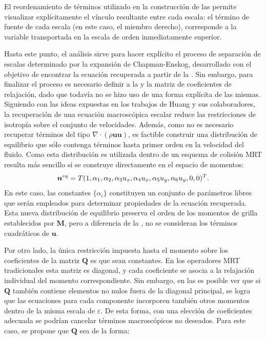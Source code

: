 El reordenamiento de t\'erminos utilizado en la construcci\'on de las  permite visualizar expl\'icitamente el v\'inculo resultante entre cada escala: el t\'ermino de fuente de cada escala (en este caso, el miembro derecho), corresponde a la variable transportada en la escala de orden inmediatamente superior.

Hasta este punto, el an\'alisis sirve para hacer expl\'icito el proceso de separaci\'on de escalas determinado por la expansi\'on de Chapman-Enskog, desarrollado con el objetivo de encontrar la ecuaci\'on recuperada a partir de la . Sin embargo, para finalizar el proceso es necesario definir a la \edf{} y la matriz de coeficientes de relajaci\'on, dado que todav\'ia no se hizo uso de una forma expl\'icita de las mismas. Siguiendo con las ideas expuestas en los trabajos de Huang y sus colaboradores, la recuperaci\'on de una ecuaci\'on macrosc\'opica escalar reduce las restricciones de isotrop\'ia sobre el conjunto de velocidades. Adem\'as, como no es necesario recuperar t\'erminos del tipo $\nabla \cdot(\rho \bm{uu})$, es factible construir una distribuci\'on de equilibrio que s\'olo contenga t\'erminos hasta primer orden en la velocidad del fluido. Como esta distribuci\'on es utilizada dentro de un esquema de colisi\'on MRT resulta m\'as sencillo si se construye directamente en el espacio de momentos:
\begin{equation}
	\bm{n}^{eq} = T(1, \alpha_1, \alpha_2, \alpha_3 u_x, \alpha_4 u_x, \alpha_5 u_y, \alpha_6 u_y, 0, 0 )^T.
\end{equation}
En este caso, las constantes $\{ \alpha_i \}$ constituyen un conjunto de par\'ametros libres que ser\'an empleados para determinar propiedades de la ecuaci\'on recuperada. Esta nueva distribuci\'on de equilibrio preserva el orden de los momentos de grilla establecidos por $\bm{M}$, pero a diferencia de la , no se consideran los t\'erminos cuadr\'aticos de $\bm{u}$.

Por otro lado, la \'unica restricci\'on impuesta hasta el momento sobre los coeficientes de la matriz $\bm{Q}$ es que sean constantes. En los operadores MRT tradicionales esta matriz es diagonal, y cada coeficiente se asocia a la relajaci\'on individual del momento correspondiente. Sin embargo, en las  es posible ver que si $\bm{Q}$ tambi\'en contiene elementos no nulos fuera de la diagonal principal, se logra que las ecuaciones para cada componente incorporen tambi\'en otros momentos dentro de la misma escala de $\varepsilon$. De esta forma, con una elecci\'on de coeficientes adecuada se podr\'ian cancelar t\'erminos macrosc\'opicos no deseados. Para este caso, se propone que $\bm{Q}$ sea de la forma:

